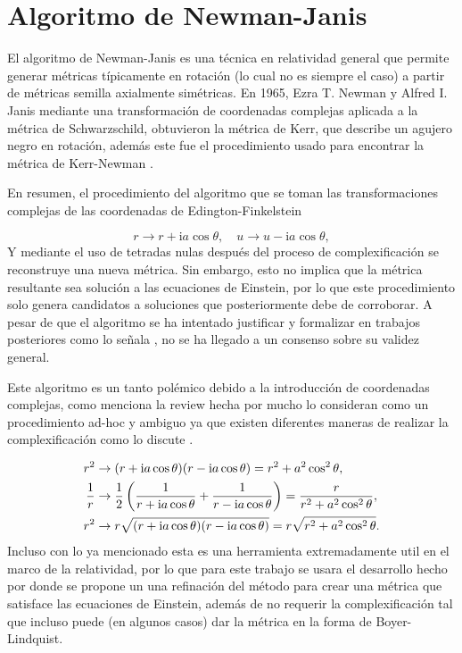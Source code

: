 
\section[Algoritmo de Newman-Janis]{Algoritmo de Newman-Janis}

El algoritmo de Newman-Janis es una técnica en relatividad general que permite generar métricas típicamente en rotación (lo cual no es siempre el caso) a partir de métricas semilla  axialmente simétricas. En 1965, Ezra T. Newman y Alfred I. Janis \cite{newman-1965}  mediante una transformación de coordenadas complejas aplicada a la métrica de Schwarzschild, obtuvieron la métrica de Kerr, que describe un agujero negro en rotación, además este fue el procedimiento usado para encontrar la métrica de Kerr-Newman\cite{newman-1965b} .

En resumen, el procedimiento del algoritmo que se toman las transformaciones complejas de las coordenadas de Edington-Finkelstein

\begin{equation}
    r \rightarrow r+\mathrm{i} a \cos \theta, \quad u \rightarrow u-\mathrm{i} a \cos \theta,
\end{equation}
Y mediante el uso de tetradas nulas después del proceso de complexificación se reconstruye una nueva métrica. Sin embargo, esto no implica que la métrica resultante sea solución a las ecuaciones de Einstein, por lo que este procedimiento solo genera candidatos a soluciones que posteriormente debe de corroborar.
A pesar de que el algoritmo se ha intentado justificar y formalizar en trabajos posteriores como lo señala \cite{drake-2000}, no se ha llegado a un consenso sobre su validez general.

Este algoritmo es un tanto polémico debido a la introducción de coordenadas complejas, como menciona la review hecha por \cite{drake-2000} mucho lo consideran como un procedimiento ad-hoc y ambiguo ya que existen diferentes maneras de realizar la complexificación como lo discute \cite{azreg-ainou-2014} .

\begin{align}
    r^2       & \rightarrow(r+\mathrm{i} a \cos \theta)(r-\mathrm{i} a \cos \theta)=r^2+a^2 \cos ^2 \theta,                                             \\
    \frac{1}{r} & \rightarrow \frac{1}{2}\left(\frac{1}{r+\mathrm{i} a \cos \theta}+\frac{1}{r-\mathrm{i} a \cos \theta}\right)=\frac{r}{r^2+a^2 \cos ^2 \theta}, \\
    r^2       & \rightarrow r \sqrt{(r+\mathrm{i} a \cos \theta)(r-\mathrm{i} a \cos \theta)}=r \sqrt{r^2+a^2 \cos ^2 \theta} .
\end{align}
Incluso con lo ya mencionado esta es una herramienta extremadamente util en el marco de la relatividad, por lo que para este trabajo se usara el desarrollo hecho por \cite{azreg-ainou-2014} donde se propone un una refinación del método para crear una métrica que satisface las ecuaciones de Einstein, además de no requerir la complexificación tal que incluso puede (en algunos casos) dar la métrica en la forma de Boyer-Lindquist.

